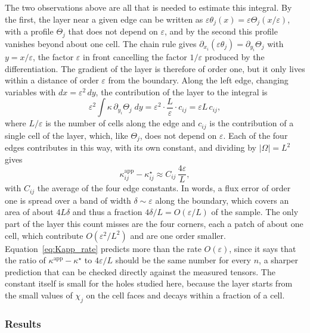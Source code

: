\documentclass{article}
\makeatletter
\providecommand\FloatBarrier{\par\begingroup\let\@elt\relax
  \edef\@tempa{\@botlist\@deferlist\@dbldeferlist}%
  \ifx\@tempa\@empty\else\clearpage\fi\endgroup}
\makeatother
\begin{document}
The two observations above are all that is needed to estimate this integral. By the
first, the layer near a given edge can be written as
$\varepsilon \theta_j (x) = \varepsilon \Theta_j (x / \varepsilon)$, with a profile
$\Theta_j$ that does not depend on $\varepsilon$, and by the second this profile vanishes
beyond about one cell. The chain rule gives
$\partial_{x_i} (\varepsilon \theta_j) = \partial_{y_i} \Theta_j$ with $y = x / \varepsilon$,
the factor $\varepsilon$ in front cancelling the factor $1 / \varepsilon$ produced by the
differentiation. The gradient of the layer is therefore of order one, but it only lives
within a distance of order $\varepsilon$ from the boundary. Along the left edge, changing
variables with $dx = \varepsilon^2 \, dy$, the contribution of the layer to the integral
is
\[ \varepsilon^2 \int \kappa \, \partial_{y_i} \Theta_j \; dy = \varepsilon^2 \cdot
   \frac{L}{\varepsilon} \cdot c_{ij} = \varepsilon L \, c_{ij}, \]
where $L / \varepsilon$ is the number of cells along the edge and $c_{ij}$ is the
contribution of a single cell of the layer, which, like $\Theta_j$, does not depend on
$\varepsilon$. Each of the four edges contributes in this way, with its own constant, and
dividing by $| \Omega | = L^2$ gives
\begin{equation}
  \label{eq:Kapp_rate}
  \kappa^{\mathrm{app}}_{ij} - \kappa^{\star}_{ij} \approx C_{ij} \, \frac{4
  \varepsilon}{L},
\end{equation}
with $C_{ij}$ the average of the four edge constants. In words, a flux error of order one
is spread over a band of width $\delta \sim \varepsilon$ along the boundary, which covers
an area of about $4 L \delta$ and thus a fraction $4 \delta / L = O (\varepsilon / L)$ of
the sample. The only part of the layer this count misses are the four corners, each a
patch of about one cell, which contribute $O (\varepsilon^2 / L^2)$ and are one order
smaller. Equation~\eqref{eq:Kapp_rate} predicts more than the rate $O (\varepsilon)$, since
it says that the ratio of $\kappa^{\mathrm{app}} - \kappa^{\star}$ to
$4 \varepsilon / L$ should be the same number for every $n$, a sharper prediction that can
be checked directly against the measured tensors. The constant itself is small for the
holes studied here, because the layer starts from the small values of $\chi_j$ on the cell
faces and decays within a fraction of a cell.

\FloatBarrier
\subsubsection{Results}
\label{sec:results}
\end{document}
